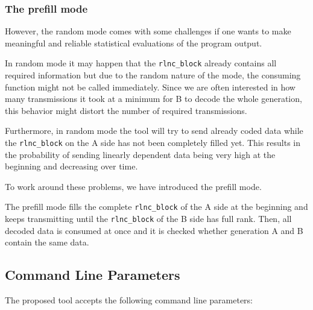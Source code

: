\documentclass[a4paper,english,10pt]{tumarticle}
\begin{document}
\subsubsection{The prefill mode}\label{sec:prefill}
However, the random mode comes with some challenges if one wants to make meaningful and reliable statistical 
evaluations of the program output.

In random mode it may happen that the \texttt{rlnc\_block} already contains all required information but due
to the random nature of the mode, the consuming function might not be called immediately.
Since we are often interested in how many transmissions it took at a minimum for B to decode the whole generation, this behavior 
might distort the number of required transmissions.

Furthermore, in random mode the tool will try to send already coded data while the \texttt{rlnc\_block} on the A side has not been completely filled yet. 
This results in the probability of sending linearly dependent data being very high at the beginning and decreasing over time. 

To work around these problems, we have introduced the prefill mode.

The prefill mode fills the complete \texttt{rlnc\_block} of the A side at the beginning and keeps transmitting until the 
\texttt{rlnc\_block} of the B side has full rank. Then, all decoded data is consumed at once and it is checked 
whether generation A and B contain the same data.

\subsection{Command Line Parameters}\label{app:cmd}
The proposed tool accepts the following command line parameters:
\end{document}
